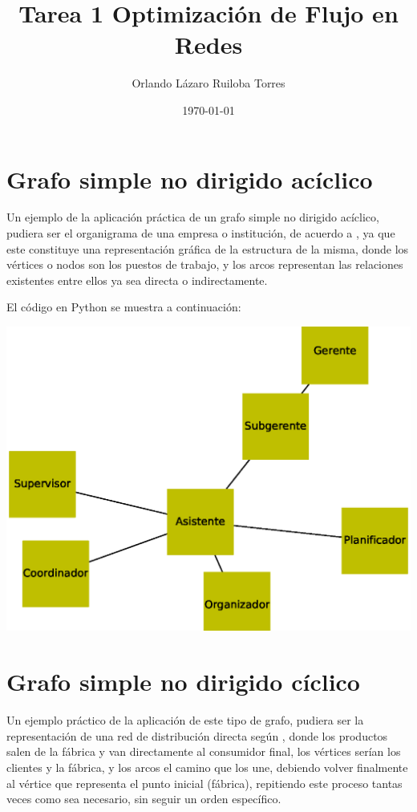 \documentclass[10pt,a4paper]{article}
\author{Orlando Lázaro Ruiloba Torres}
\title{Tarea 1 Optimización de Flujo en Redes}
\date{\today}
\begin{document}
\maketitle

\section{Grafo simple no dirigido acíclico}

Un ejemplo de la aplicación práctica de un grafo simple no dirigido acíclico, pudiera ser el organigrama de una empresa o institución, de acuerdo a \cite{art1}, ya que este constituye una representación gráfica de la estructura de la misma, donde los vértices o nodos son los puestos de trabajo, y los arcos representan las relaciones existentes entre ellos ya sea directa o indirectamente.\vspace{.4cm} 

El código en Python se muestra a continuación:



\begin{center}

\includegraphics[scale=0.4]{GNDA}

\end{center}

\section{Grafo simple no dirigido cíclico}

Un ejemplo práctico de la aplicación de este tipo de grafo, pudiera ser la representación de una red de distribución directa según \cite{art2}, donde los productos salen de la fábrica y van directamente al consumidor final, los vértices serían los clientes y la fábrica, y los arcos el camino que los une, debiendo volver finalmente al vértice que representa el punto inicial (fábrica), repitiendo este proceso tantas veces como sea necesario, sin seguir un orden específico.\newpage
\end{document}
